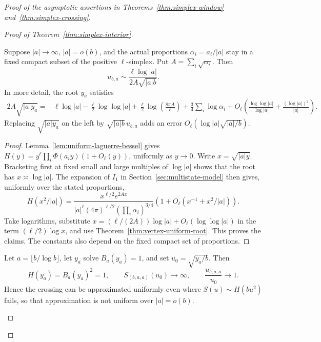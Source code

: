 \begin{proof}[Proof of the asymptotic assertions in
Theorems~\ref{thm:simplex-window} and~\ref{thm:simplex-crossing}]
\begin{proof}[Proof of Theorem~\ref{thm:simplex-interior}]
\begin{corollary}
\label{cor:vertex-shape-law}
Suppose $|a|\to\infty$, $|a|=o(b)$, and the actual proportions
$\alpha_i=a_i/|a|$ stay in a fixed compact subset of the positive
$\ell$-simplex. Put $A=\sum_i\sqrt{\alpha_i}$. Then
\[
 u_{b,a}\sim\frac{\ell\log|a|}{2A\sqrt{|a|b}}.
\]
In more detail, the root $y_a$ satisfies
\begin{align*}
 2A\sqrt{|a|y_a}
 ={}&\ell\log|a|-\frac\ell2\log\log|a|
 +\frac\ell2\log\!\left(\frac{8\pi A}{\ell}\right)
 +\frac34\sum_i\log\alpha_i
 +O_\ell\!\left(\frac{\log\log|a|}{\log|a|}
                  +\frac{(\log|a|)^2}{|a|}\right).
\end{align*}
Replacing $\sqrt{|a|y_a}$ on the left by $\sqrt{|a|b}\,u_{b,a}$ adds an
error $O_\ell(\log|a|\sqrt{|a|/b})$.
\end{corollary}

\begin{proof}
Lemma~\ref{lem:uniform-laguerre-bessel} gives
$H(y)=y^\ell\prod_i\Phi(a_iy)(1+O_\ell(y))$, uniformly as $y\to0$.
Write $x=\sqrt{|a|y}$. Bracketing first at fixed small and large
multiples of $\log|a|$ shows that the root has $x\asymp\log|a|$.
The expansion of $I_1$ in Section~\ref{sec:multistate-model} then gives,
uniformly over the stated proportions,
\[
 H(x^2/|a|)=
 \frac{x^{\ell/2}e^{2Ax}}
 {|a|^\ell(4\pi)^{\ell/2}(\prod_i\alpha_i)^{3/4}}
 \left(1+O_\ell(x^{-1}+x^2/|a|)\right).
\]
Take logarithms, substitute $x=(\ell/(2A))\log|a|+O_\ell(\log\log|a|)$ in
the term $(\ell/2)\log x$, and use Theorem~\ref{thm:vertex-uniform-root}.
This proves the claims. The constants also depend on the fixed compact set
of proportions.
\end{proof}

\begin{proposition}
\label{prop:vertex-probability-failure}
Let $a=\lfloor b/\log b\rfloor$, let $y_a$ solve $B_a(y_a)=1$,
and set $u_0=\sqrt{y_a/b}$. Then
\[
 H(y_a)=B_a(y_a)^2=1,\qquad
 S_{(b,a,a)}(u_0)\longrightarrow\infty,
 \qquad \frac{u_{b,a,a}}{u_0}\longrightarrow1.
\]
Hence the crossing can be approximated uniformly even where
$S(u)\sim H(bu^2)$ fails, so that approximation is not uniform over
$|a|=o(b)$.
\end{proposition}


\end{proof}
\end{proof}
